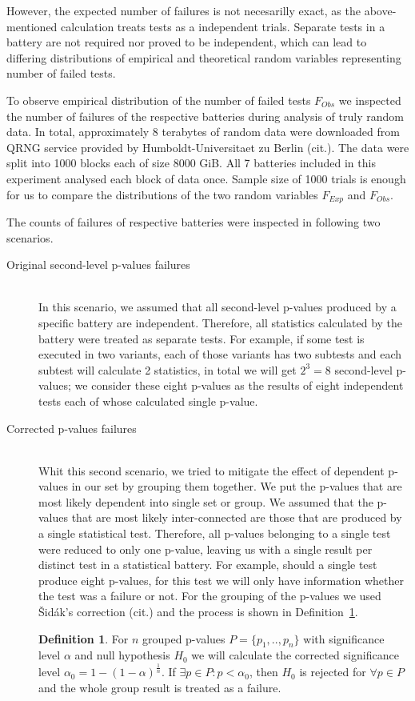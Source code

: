 \documentclass[
  digital,  	%
  color,		%
  oneside,   	%
  12pt,
  nocover,
  notable,
  nolof,
  nolot,
]{fithesis3}
\theoremstyle{definition}
\newtheorem{definition}{Definition}[section]
\theoremstyle{remark}
\begin{document}
However, the expected number of failures is not necesarilly exact, as the above-mentioned calculation treats tests as a independent trials. Separate tests in a battery are not required nor proved to be independent, which can lead to differing distributions of empirical and theoretical random variables representing number of failed tests.

To observe empirical distribution of the number of failed tests $F_{Obs}$ we inspected the number of failures of the respective batteries during analysis of truly random data. In total, approximately 8 terabytes of random data were downloaded from QRNG service provided by Humboldt-Universitaet zu Berlin (cit.). The data were split into 1000 blocks each of size 8000 GiB. All 7 batteries included in this experiment analysed each block of data once. Sample size of 1000 trials is enough for us to compare the distributions of the two random variables $F_{Exp}$ and $F_{Obs}$.

The counts of failures of respective batteries were inspected in following two scenarios.

\begin{description}
\item[Original second-level p-values failures] \hfill \\
In this scenario, we assumed that all second-level p-values produced by a specific battery are independent. Therefore, all statistics calculated by the battery were treated as separate tests. For example, if some test is executed in two variants, each of those variants has two subtests and each subtest will calculate 2 statistics, in total we will get $2^3=8$ second-level p-values; we consider these eight p-values as the results of eight independent tests each of whose calculated single p-value. 

\item[Corrected p-values failures] \hfill \\
Whit this second scenario, we tried to mitigate the effect of dependent p-values in our set by grouping them together. We put the p-values that are most likely dependent into single set or group. We assumed that the p-values that are most likely inter-connected are those that are produced by a single statistical test. Therefore, all p-values belonging to a single test were reduced to only one p-value, leaving us with a single result per distinct test in a statistical battery. For example, should a single test produce eight p-values, for this test we will only have information whether the test was a failure or not. For the grouping of the p-values we used Šidák's correction (cit.) and the process is shown in Definition~\ref{def:sidak}.

\begin{definition}
\label{def:sidak}
For $n$ grouped p-values $P = \{p_1,..,p_n\}$ with significance level $\alpha$ and null hypothesis $H_0$ we will calculate the corrected significance level $\alpha_0 = 1 - (1 - \alpha)^{\frac{1}{n}}$. If $\exists p \in P : p < \alpha_0$, then $H_0$ is rejected for $\forall p \in P$ and the whole group result is treated as a failure.
\end{definition}

\end{description}
\end{document}
